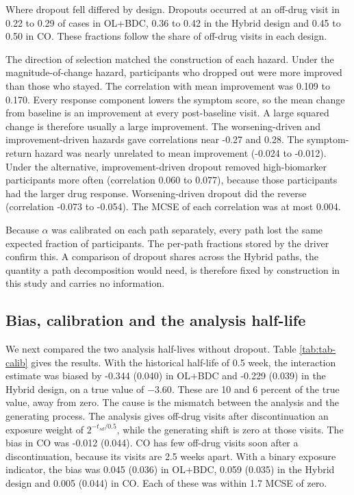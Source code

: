 \documentclass[
  11pt,
]{article}
\begin{document}
Where dropout fell differed by design. Dropouts occurred at an
off-drug visit in
0.22
to
0.29
of cases in OL+BDC,
0.36
to
0.42
in the Hybrid design and
0.45
to
0.50
in CO. These fractions follow the share of off-drug visits in each
design.

The direction of selection matched the construction of each hazard.
Under the magnitude-of-change hazard, participants who dropped out
were more improved than those who stayed. The correlation
with mean improvement was
0.109
to
0.170.
Every response component lowers the symptom score, so the mean change
from baseline is an improvement at every post-baseline visit. A large
squared change is therefore usually a large improvement. The worsening-driven and
improvement-driven hazards gave correlations near
-0.27
and
0.28.
The symptom-return hazard was nearly unrelated to mean improvement
(-0.024
to
-0.012).
Under the alternative, improvement-driven dropout removed
high-biomarker participants more often (correlation
0.060
to
0.077),
because those participants had the larger drug response.
Worsening-driven dropout did the reverse (correlation
-0.073
to
-0.054).
The MCSE of each correlation was at most
0.004.

Because \(\alpha\) was calibrated on each path separately, every path
lost the same expected fraction of participants. The per-path
fractions stored by the driver confirm this. A comparison of dropout
shares across the Hybrid paths, the quantity a path decomposition
would need, is therefore fixed by construction in this study and
carries no information.

\subsection{Bias, calibration and the analysis half-life}\label{sec-bias}

We next compared the two analysis half-lives without dropout. Table
\ref{tab:tab-calib} gives the results. With the historical half-life
of 0.5 week, the interaction estimate was biased by
-0.344 (0.040)
in OL+BDC and
-0.229 (0.039)
in the Hybrid design, on a true value of \(-3.60\). These are
10
and
6
percent of the true value, away from zero. The cause is the mismatch
between the analysis and the generating process. The analysis gives
off-drug visits after discontinuation an exposure weight of
\(2^{-t_{sd}/0.5}\), while the generating shift is zero at those visits.
The bias in CO was
-0.012 (0.044).
CO has few off-drug visits soon after a discontinuation, because its
visits are 2.5 weeks apart. With a binary exposure indicator, the bias
was
0.045 (0.036)
in OL+BDC,
0.059 (0.035)
in the Hybrid design and
0.005 (0.044)
in CO. Each of these was within
1.7 MCSE of zero.
\end{document}
